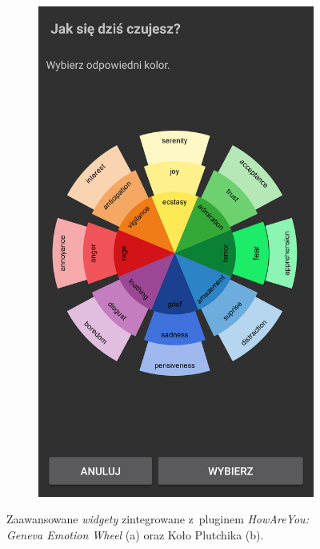 \begin{itemize}
\begin{figure}[H]
\begin{subfigure}{0.35\textwidth}
			\subcaption{\label{subfigure_a}}
		\end{subfigure}
		\begin{subfigure}{0.35\textwidth}
			\centering
			\includegraphics[scale=0.22]{rozdzial6/jspsych-plutchik-wheel-2}
			\subcaption{\label{subfigure_b}}
		\end{subfigure}
		\caption{ Zaawansowane \textit{widgety} zintegrowane z~pluginem \textit{HowAreYou: } \textit{Geneva Emotion Wheel} (a) oraz Koło Plutchika (b).}
	\end{figure}
	
\end{itemize}